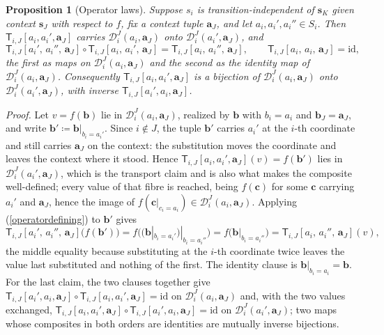 \documentclass{article}
\newtheorem{proposition}{Proposition}
\theoremstyle{definition}
\theoremstyle{remark}
\begin{document}
\begin{proposition}[Operator laws]
\label{operatorlaws}
Suppose $s_i$ is transition-independent of $\boldsymbol{s}_K$ given context $\boldsymbol{s}_J$ with respect to $f$, fix a context tuple $\boldsymbol{a}_J$, and let $a_i, a_i', a_i'' \in S_i$. Then $\mathsf{T}_{i,J}[a_i, a_i', \boldsymbol{a}_J]$ carries $\mathcal{D}_i^J(a_i, \boldsymbol{a}_J)$ onto $\mathcal{D}_i^J(a_i', \boldsymbol{a}_J)$, and
\[
\mathsf{T}_{i,J}[a_i',\, a_i'',\, \boldsymbol{a}_J] \circ \mathsf{T}_{i,J}[a_i,\, a_i',\, \boldsymbol{a}_J] = \mathsf{T}_{i,J}[a_i,\, a_i'',\, \boldsymbol{a}_J],
\qquad
\mathsf{T}_{i,J}[a_i,\, a_i,\, \boldsymbol{a}_J] = \mathrm{id},
\]
the first as maps on $\mathcal{D}_i^J(a_i, \boldsymbol{a}_J)$ and the second as the identity map of $\mathcal{D}_i^J(a_i, \boldsymbol{a}_J)$. Consequently $\mathsf{T}_{i,J}[a_i, a_i', \boldsymbol{a}_J]$ is a bijection of $\mathcal{D}_i^J(a_i, \boldsymbol{a}_J)$ onto $\mathcal{D}_i^J(a_i', \boldsymbol{a}_J)$, with inverse $\mathsf{T}_{i,J}[a_i', a_i, \boldsymbol{a}_J]$.
\end{proposition}

\noindent \textit{Proof.} Let $v = f(\boldsymbol{b})$ lie in $\mathcal{D}_i^J(a_i, \boldsymbol{a}_J)$, realized by $\boldsymbol{b}$ with $b_i = a_i$ and $\boldsymbol{b}_J = \boldsymbol{a}_J$, and write $\boldsymbol{b}' \coloneqq \boldsymbol{b}|_{b_i = a_i'}$. Since $i \notin J$, the tuple $\boldsymbol{b}'$ carries $a_i'$ at the $i$-th coordinate and still carries $\boldsymbol{a}_J$ on the context: the substitution moves the coordinate and leaves the context where it stood. Hence $\mathsf{T}_{i,J}[a_i, a_i', \boldsymbol{a}_J](v) = f(\boldsymbol{b}')$ lies in $\mathcal{D}_i^J(a_i', \boldsymbol{a}_J)$, which is the transport claim and is also what makes the composite well-defined; every value of that fibre is reached, being $f(\boldsymbol{c})$ for some $\boldsymbol{c}$ carrying $a_i'$ and $\boldsymbol{a}_J$, hence the image of $f(\boldsymbol{c}|_{c_i = a_i}) \in \mathcal{D}_i^J(a_i, \boldsymbol{a}_J)$. Applying (\ref{operatordefining}) to $\boldsymbol{b}'$ gives
\[
\mathsf{T}_{i,J}[a_i',\, a_i'',\, \boldsymbol{a}_J]\bigl(f(\boldsymbol{b}')\bigr)
= f\bigl((\boldsymbol{b}|_{b_i = a_i'})|_{b_i = a_i''}\bigr)
= f\bigl(\boldsymbol{b}|_{b_i = a_i''}\bigr)
= \mathsf{T}_{i,J}[a_i,\, a_i'',\, \boldsymbol{a}_J](v),
\]
the middle equality because substituting at the $i$-th coordinate twice leaves the value last substituted and nothing of the first. The identity clause is $\boldsymbol{b}|_{b_i = a_i} = \boldsymbol{b}$. For the last claim, the two clauses together give $\mathsf{T}_{i,J}[a_i', a_i, \boldsymbol{a}_J] \circ \mathsf{T}_{i,J}[a_i, a_i', \boldsymbol{a}_J] = \mathrm{id}$ on $\mathcal{D}_i^J(a_i, \boldsymbol{a}_J)$ and, with the two values exchanged, $\mathsf{T}_{i,J}[a_i, a_i', \boldsymbol{a}_J] \circ \mathsf{T}_{i,J}[a_i', a_i, \boldsymbol{a}_J] = \mathrm{id}$ on $\mathcal{D}_i^J(a_i', \boldsymbol{a}_J)$; two maps whose composites in both orders are identities are mutually inverse bijections.
\end{document}
